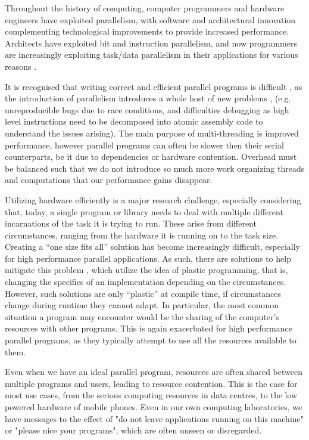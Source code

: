 
Throughout the history of computing, computer programmers and hardware engineers have exploited parallelism, with software and architectural innovation complementing technological improvements to provide increased performance. Architects have exploited bit and instruction parallelism, and now programmers are increasingly exploiting task/data parallelism in their applications \cite{concurrency_revolution} for various reasons \cite{free_lunch}.

It is recognised that writing correct and efficient parallel programs is difficult \cite{parallel_challenges}, as the introduction of parallelism introduces a whole host of new problems \cite{sequential_to_parallel}, (e.g. unreproducible bugs due to race conditions, and difficulties debugging as high level instructions need to be decomposed into atomic assembly code to understand the issues arising). The main purpose of multi-threading is improved performance, however parallel programs can often be slower then their serial counterparts, be it due to dependencies or hardware contention. Overhead must be balanced such that we do not introduce so much more work organizing threads and computations that our performance gains disappear.

Utilizing hardware efficiently is a major research challenge, especially considering that, today, a single program or library needs to deal with multiple different incarnations of the task it is trying to run. These arise from different circumstances, ranging from the hardware it is running on to the task size. Creating a ``one size fits all'' solution has become increasingly difficult, especially for high performance parallel applications. As such, there are solutions to help mitigate this problem \cite{petabricks}, which utilize the idea of plastic programming, that is, changing the specifics of an implementation depending on the circumstances. However, such solutions are only ``plastic'' at compile time, if circumstances change during runtime they cannot adapt. In particular, the most common situation a program may encounter would be the sharing of the computer's resources with other programs. This is again exacerbated for high performance parallel programs, as they typically attempt to use all the resources available to them.

Even when we have an ideal parallel program, resources are often shared between multiple programs and users, leading to resource contention. This is the case for most use cases, from the serious computing resources in data centres, to the low powered hardware of mobile phones. Even in our own computing laboratories, we have messages to the effect of "do not leave applications running on this machine" or "please nice your programs", which are often unseen or disregarded.


